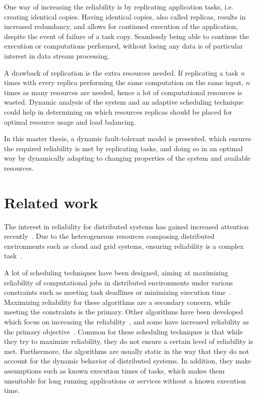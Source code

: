 \documentclass{cslthse-msc}
\begin{document}
One way of increasing the reliability is by replicating application tasks, i.e. creating identical copies. Having identical copies, also called replicas, results in increased redundancy, and allows for continued execution of the application, despite the event of failure of a task copy. Seamlessly being able to continue the execution or computations performed, without losing any data is of particular interest in data stream processing.

A drawback of replication is the extra resources needed. If replicating a task \emph{n} times with every replica performing the same computation on the same input, $n$ times as many resources are needed, hence a lot of computational resources is wasted. Dynamic analysis of the system and an adaptive scheduling technique could help in determining on which resources replicas should be placed for optimal resource usage and load balancing.

In this master thesis, a dynamic fault-tolerant model is presented, which ensures the required reliability is met by replicating tasks, and doing so in an optimal way by dynamically adapting to changing properties of the system and available resources.

\section{Related work} \label{sec:introduction_related_work}
The interest in reliability for distributed systems has gained increased attention recently~\cite{replicationManagement}. Due to the heterogeneous resources composing distributed environments such as cloud and grid systems, ensuring reliability is a complex task~\cite{cloudServiceRel, surveyReliabilityDistr}.

A lot of scheduling techniques have been designed, aiming at maximizing reliability of computational jobs in distributed environments under various constraints such as meeting task deadlines or minimizing execution time~\cite{algoOptTimeMaxRel, optTaskAllocationForMaxRel, taskAllocation, taskAllocationSwarm, algoMaxRelEndToEndConstraint, algoMinExTime, schedReplicas}. Maximizing reliability for these algorithms are a secondary concern, while meeting the constraints is the primary. Other algorithms have been developed which focus on increasing the reliability~\cite{optResourceAllMaxPerformance, matchSchedAlgoMinFailure}, and some have increased reliability as the primary objective~\cite{safetyRelTaskAllocation, improvedTaskAllMaxRel}. Common for these scheduling techniques is that while they try to maximize reliability, they do not ensure a certain level of reliability is met. Furthermore, the algorithms are usually static in the way that they do not account for the dynamic behavior of distributed systems. In addition, they make assumptions such as known execution times of tasks, which makes them unsuitable for long running applications or services without a known execution time.
\end{document}
